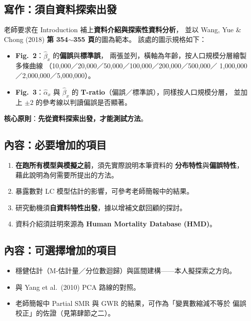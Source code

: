 \documentclass[UTF8, fontset=macnew, a4paper, 12pt]{ctexart}
\begin{document}
\subsection{寫作：須自資料探索出發}

老師要求在 Introduction 補上\textbf{資料介紹與探索性資料分析}，
並以 Wang, Yue \& Chong (2018) \textbf{第 354$\sim$355 頁}的圖為範本。
該處的圖示規格如下：

\begin{itemize}
  \item \textbf{Fig.~2}：$\hat\beta_x$ 的\textbf{偏誤}與\textbf{標準誤}，
        兩張並列，橫軸為年齡，按人口規模分層繪製多條曲線
        （10,000／20,000／50,000／100,000／200,000／500,000／
        1,000,000／2,000,000／5,000,000）。
  \item \textbf{Fig.~3}：$\hat\alpha_x$ 與 $\hat\beta_x$ 的
        \textbf{T-ratio}（偏誤／標準誤），同樣按人口規模分層，
        並加上 $\pm2$ 的參考線以判讀偏誤是否顯著。
\end{itemize}

\noindent\textbf{核心原則}：\textbf{先從資料探索出發，才能測試方法}。

\subsection{內容：必要增加的項目}

\begin{enumerate}[leftmargin=*]
  \item \textbf{在跑所有模型與模擬之前}，須先實際說明本筆資料的
        \textbf{分布特性}與\textbf{偏誤特性}，藉此說明為何需要所提出的方法。
  \item 暴露數對 LC 模型估計的影響，可參考老師簡報中的結果。
  \item 研究動機須\textbf{自資料特性出發}，據以增補文獻回顧的探討。
  \item 資料介紹須註明來源為 \textbf{Human Mortality Database (HMD)}。
\end{enumerate}

\subsection{內容：可選擇增加的項目}

\begin{itemize}
  \item 穩健估計（M-估計量／分位數迴歸）與區間建構——本人擬探索之方向。
  \item 與 Yang et al.\ (2010) PCA 路線的對照。
  \item 老師簡報中 Partial SMR 與 GWR 的結果，可作為「變異數縮減不等於
        偏誤校正」的佐證（見第肆節之二）。
\end{itemize}
\end{document}
